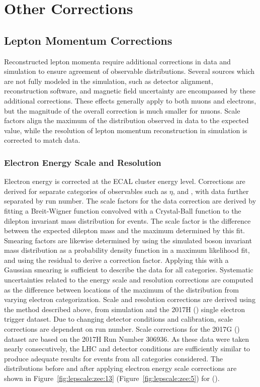 \chapter{Other Corrections}\label{ch:corrs}
\section{Lepton Momentum Corrections}
Reconstructed lepton momenta require additional corrections in data and simulation to ensure agreement of observable distributions. Several sources which are not fully modeled in the simulation, such as detector alignment, reconstruction software, and magnetic field uncertainty are encompassed by these additional corrections. These effects generally apply to both muons and electrons, but the magnitude of the overall correction is much smaller for muons. Scale factors align the maximum of the \zll \mll distribution observed in data to the expected value, while the resolution of lepton momentum reconstruction in simulation is corrected to match data.
\subsection{Electron Energy Scale and Resolution}
Electron energy is corrected at the ECAL cluster energy level. Corrections are derived for separate categories of observables such as $\eta$, and \et, with data further separated by run number. The scale factors for the data correction are derived by fitting a Breit-Wigner function\cite{Breit:1936zzb} convolved with a Crystal-Ball function\cite{Oreglia:1980cs,Skwarnicki:1986xj} to the dilepton invariant mass distribution for \zee events. The scale factor is the difference between the expected dilepton mass and the maximum determined by this fit. Smearing factors are likewise determined by using the simulated \Z boson invariant mass distribution as a probability density function in a maximum likelihood fit, and using the residual to derive a correction factor. Applying this with a Gaussian smearing is sufficient to describe the data for all categories\cite{Khachatryan:2015iwa}.
Systematic uncertainties related to the energy scale and resolution corrections are computed as the difference between locations of the maximum of the \zee \mll distribution from varying electron categorization. 
Scale and resolution corrections are derived using the method described above, from \zee simulation and the 2017H (\serah) single electron trigger dataset. Due to changing detector conditions and calibration, scale corrections are dependent on run number. Scale corrections for the 2017G (\serag) dataset are based on the 2017H Run Number 306936. As these data were taken nearly consecutively, the LHC and detector conditions are sufficiently similar to produce adequate results for events from all categories considered.
The \mll distributions before and after applying electron energy scale corrections are shown in Figure~\ref{fig:lepscale:zee:13} (Figure~\ref{fig:lepscale:zee:5}) for \serah (\serag). 

